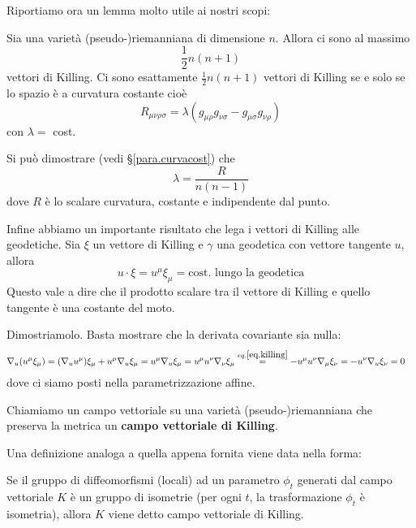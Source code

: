 Riportiamo ora un lemma molto utile ai nostri scopi:
\begin{lemma}\label{teo.killing}
Sia una varietà (pseudo-)riemanniana di dimensione $n$. Allora ci sono al massimo
\begin{equation*}
    \frac{1}{2}n(n+1)
\end{equation*}
vettori di Killing.
Ci sono esattamente $\frac{1}{2}n(n+1)$ vettori di Killing se e solo se lo spazio è a curvatura costante cioè
\begin{equation}
    R_{\mu\nu\rho\sigma} = \lambda(g_{\mu\rho}g_{\nu\sigma} - g_{\mu\sigma}g_{\nu\rho} )
    \label{eq.riemann_curvatura_costante}
\end{equation}
con $\lambda =$ cost.
\end{lemma}

Si può dimostrare (vedi \S\ref{para.curvacost}) che
\begin{equation}
    \lambda = \frac{R}{n(n-1)}
    \label{eq.costvettorikillinglambda}
\end{equation}
dove $R$ è lo scalare curvatura, costante e indipendente dal punto.

Infine abbiamo un importante risultato che lega i vettori di Killing alle geodetiche. Sia $\xi$ un vettore di Killing e $\gamma$ una geodetica con vettore tangente $u$, allora
\begin{equation}
    u \cdot \xi = u^\mu \xi_\mu = \textrm{cost. lungo la geodetica}
    \label{eq.killgeodetiche}
\end{equation}
Questo vale a dire che il prodotto scalare tra il vettore di Killing e quello tangente è una costante del moto.

Dimostriamolo. Basta mostrare che la derivata covariante sia nulla:
\begin{align*}
    \nabla_u (u^\mu \xi_\mu) &= (\nabla_u u^\mu)\xi_\mu + u^\mu \nabla_u \xi_\mu = u^\mu \nabla_u \xi_\mu = u^\mu u^\nu \nabla_\nu \xi_\mu \overset{eq. \ref{eq.killing}}{=} - u^\mu u^\nu \nabla_\mu \xi_\nu = -u^\nu \nabla_u \xi_\nu = 0
\end{align*}
dove ci siamo posti nella parametrizzazione affine.

\begin{definizione}
Chiamiamo un campo vettoriale su una varietà (pseudo-)riemanniana che preserva la metrica un \textbf{campo vettoriale di Killing}.
\end{definizione}
Una definizione analoga a quella appena fornita viene data nella forma: 
\begin{definizione}
Se il gruppo di diffeomorfismi (locali) ad un parametro $\phi_t$ generati dal campo vettoriale $K$ è un gruppo di isometrie (per ogni  $t$, la trasformazione $\phi_t$ è isometria), allora $K$ viene detto campo vettoriale di Killing.
\end{definizione}

